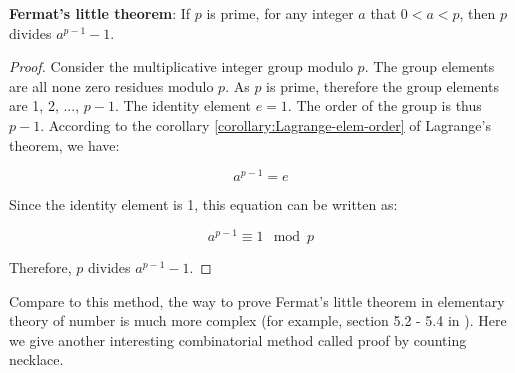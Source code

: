 \documentclass{article}
\begin{document}
\begin{theorem}
\textbf{Fermat's little theorem}: If $p$ is prime, for any integer $a$ that $0 < a < p$, then $p$ divides $a^{p-1}-1$.
\end{theorem}

\begin{proof}
Consider the multiplicative integer group modulo $p$. The group elements are all none zero residues modulo $p$. As $p$ is prime, therefore the group elements are 1, 2, ..., $p-1$. The identity element $e = 1$. The order of the group is thus $p-1$. According to the corollary \ref{corollary:Lagrange-elem-order} of Lagrange's theorem, we have:

\[
a^{p-1} = e
\]

Since the identity element is 1, this equation can be written as:

\[
a^{p-1} \equiv 1 \mod p
\]

Therefore, $p$ divides $a^{p-1} - 1$.
\end{proof}

Compare to this method, the way to prove Fermat's little theorem in elementary theory of number is much more complex (for example, section 5.2 - 5.4 in \cite{StepanovRose15}). Here we give another interesting combinatorial method called proof by counting necklace\cite{Wiki-FLT-proof}.
\end{document}
